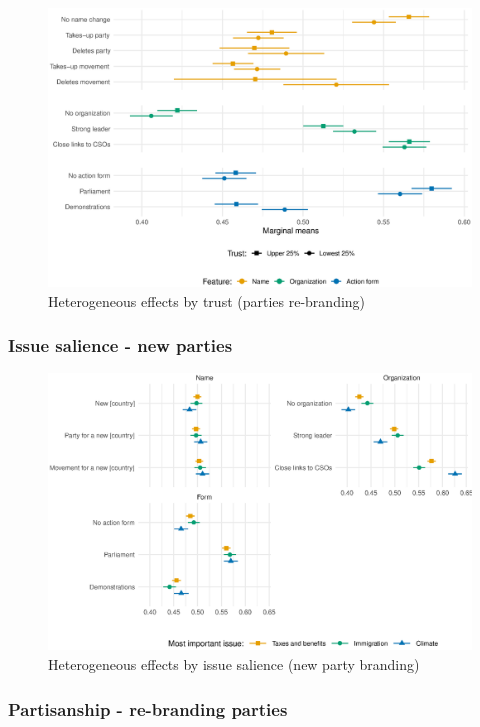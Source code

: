 \documentclass[12pt]{article}
\begin{document}
\begin{figure}[H]
\includegraphics[width=\textwidth]{./Figures/CJ2_heteff_trust_cat_tradeoff.eps}
\caption{Heterogeneous effects by trust (parties re-branding)}
\end{figure}

\subsubsection{Issue salience - new parties}

\begin{figure}[H]
\includegraphics[width=\textwidth]{./Figures/CJ1_imp_issue_tradeoff.eps}
\caption{Heterogeneous effects by issue salience (new party branding)}
\end{figure}

\subsubsection{Partisanship - re-branding parties}
\end{document}

